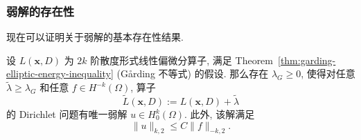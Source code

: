 \subsubsection{弱解的存在性}\label{subsec:dirichlet-weak-solution-existence}

现在可以证明关于弱解的基本存在性结果.

\begin{Theorem}
\label{thm:weak-dirichlet-positive-shift-existence}
设 $L(\bm{x},D)$ 为 $2k$ 阶散度形式线性偏微分算子, 满足 Theorem~\ref{thm:garding-elliptic-energy-inequality} (Gårding 不等式) 的假设. 那么存在 $\lambda_G\geq0$, 使得对任意 $\widetilde\lambda\geq\lambda_G$ 和任意 $f\in H^{-k}(\Omega)$, 算子
\begin{equation}\label{eq:weak-dirichlet-positive-shifted-operator}
\widetilde L(\bm{x},D):=L(\bm{x},D)+\widetilde\lambda
\end{equation}
的 Dirichlet 问题有唯一弱解 $u\in H_0^k(\Omega)$. 此外, 该解满足
\begin{equation}\label{eq:weak-dirichlet-solution-negative-norm-bound}
\|u\|_{k,2}\leq C\|f\|_{-k,2}.
\end{equation}

\end{Theorem}

